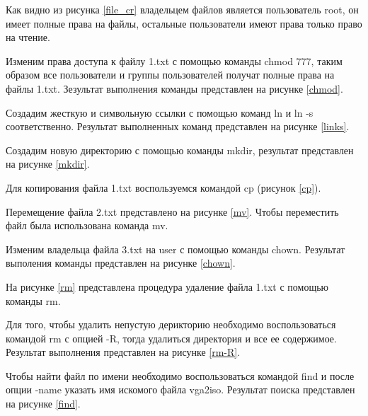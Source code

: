 Как видно из рисунка \ref{file_cr} владельцем файлов является пользователь root, он имеет полные права на файлы, остальные пользователи имеют права только право на чтение.

Изменим права доступа к файлу 1.txt с помощью команды chmod 777, таким образом все пользователи и группы пользователей получат полные права на файлы 1.txt. Зезультат выполнения команды представлен на рисунке \ref{chmod}.

\newpage
Создадим жесткую и символьную ссылки с помощью команд ln и ln -s соответственно. Результат выполненных команд представлен на рисунке \ref{links}.

Создадим новую директорию с помощью команды mkdir, результат представлен на рисунке \ref{mkdir}.

Для копирования файла 1.txt воспользуемся командой cp (рисунок \ref{cp}). 

\newpage 
Перемещение файла 2.txt представлено на рисунке \ref{mv}. Чтобы переместить файл была использована команда mv.

Изменим владельца файла 3.txt на user с помощью команды chown. Результат выполения команды представлен на рисунке \ref{chown}.

На рисунке \ref{rm} представлена процедура удаление файла 1.txt с помощью команды rm.

Для того, чтобы удалить непустую дерикторию необходимо воспользоваться командой rm с опцией -R, тогда удалиться директория и все ее содержимое. Результат выполнения представлен на рисунке \ref{rm-R}.

Чтобы найти файл по имени необходимо воспользоваться командой find и после опции -name указать имя искомого файла vga2iso. Результат поиска представлен на рисунке \ref{find}.
